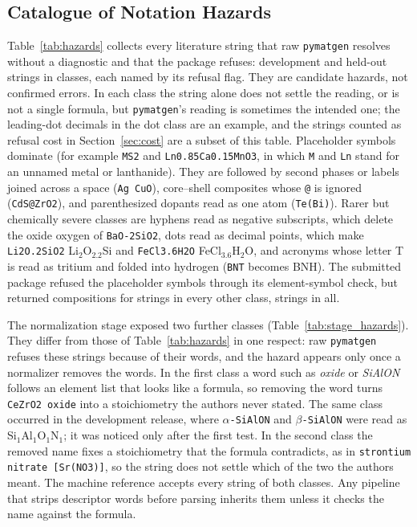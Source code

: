 \documentclass[10pt,journal]{IEEEtran}
\newcommand{\pmg}{\texttt{pymatgen}\xspace}
\begin{document}
\subsection{Catalogue of Notation Hazards}
\label{sec:hazards}
Table~\ref{tab:hazards} collects every literature string that raw \pmg resolves without a diagnostic and that the package refuses: \NHazDev{} development and \NHazHo{} held-out strings in \NHazClasses{} classes, each named by its refusal flag. They are candidate hazards, not confirmed errors. In each class the string alone does not settle the reading, or is not a single formula, but \pmg's reading is sometimes the intended one; the leading-dot decimals in the dot class are an example, and the strings counted as refusal cost in Section~\ref{sec:cost} are a subset of this table. Placeholder symbols dominate (for example \texttt{MS2} and \texttt{Ln0.85Ca0.15MnO3}, in which \texttt{M} and \texttt{Ln} stand for an unnamed metal or lanthanide). They are followed by second phases or labels joined across a space (\texttt{Ag CuO}), core--shell composites whose \texttt{@} is ignored (\texttt{CdS@ZrO2}), and parenthesized dopants read as one atom (\texttt{Te(Bi)}). Rarer but chemically severe classes are hyphens read as negative subscripts, which delete the oxide oxygen of \texttt{BaO-2SiO2}, dots read as decimal points, which make \texttt{Li2O.2SiO2} Li$_2$O$_{2.2}$Si and \texttt{FeCl3.6H2O} FeCl$_{3.6}$H$_2$O, and acronyms whose letter T is read as tritium and folded into hydrogen (\texttt{BNT} becomes BNH). The submitted package refused the placeholder symbols through its element-symbol check, but returned compositions for strings in every other class, \NHazVone{} strings in all.



The normalization stage exposed two further classes (Table~\ref{tab:stage_hazards}). They differ from those of Table~\ref{tab:hazards} in one respect: raw \pmg refuses these strings because of their words, and the hazard appears only once a normalizer removes the words. In the first class a word such as \emph{oxide} or \emph{SiAlON} follows an element list that looks like a formula, so removing the word turns \texttt{CeZrO2 oxide} into a stoichiometry the authors never stated. The same class occurred in the development release, where \texttt{$\alpha$-SiAlON} and \texttt{$\beta$-SiAlON} were read as Si$_1$Al$_1$O$_1$N$_1$; it was noticed only after the first test. In the second class the removed name fixes a stoichiometry that the formula contradicts, as in \texttt{strontium nitrate [Sr(NO3)]}, so the string does not settle which of the two the authors meant. The machine reference accepts every string of both classes. Any pipeline that strips descriptor words before parsing inherits them unless it checks the name against the formula.
\end{document}
